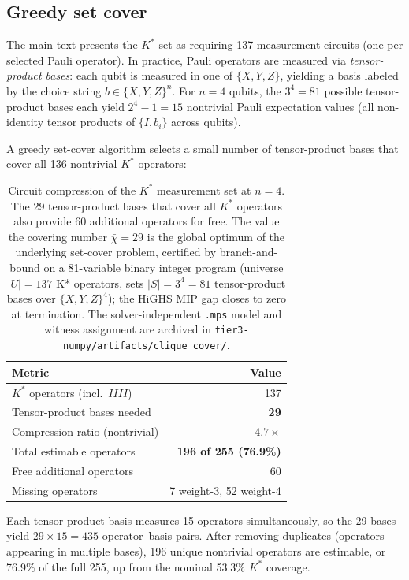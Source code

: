 \documentclass[twocolumn,prx,aps,superscriptaddress,longbibliography,floatfix]{revtex4-2}
\begin{document}
\subsection{Greedy set cover}

The main text presents the $K^*$ set as requiring 137 measurement
circuits (one per selected Pauli operator).  In practice, Pauli
operators are measured via \emph{tensor-product bases}: each qubit
is measured in one of $\{X, Y, Z\}$, yielding a basis labeled by
the choice string $b \in \{X,Y,Z\}^n$.  For $n = 4$ qubits, the
$3^4 = 81$ possible tensor-product bases each yield $2^4 - 1 = 15$
nontrivial Pauli expectation values (all non-identity tensor
products of $\{I, b_i\}$ across qubits).

A greedy set-cover algorithm selects a small number of
tensor-product bases that cover all 136 nontrivial $K^*$
operators:

\begin{table}[ht!]
\caption{Circuit compression of the $K^*$ measurement set at
$n = 4$.  The 29 tensor-product bases that cover all $K^*$
operators also provide 60 additional operators for free.  The
value the covering number $\bar\chi = 29$ is the global optimum of the underlying
set-cover problem, certified by branch-and-bound on a 81-variable
binary integer program (universe $|U|=137$ K* operators, sets
$|S|=3^4=81$ tensor-product bases over $\{X,Y,Z\}^4$); the HiGHS
MIP gap closes to zero at termination.  The solver-independent
\texttt{.mps} model and witness assignment are archived in
\texttt{tier3-numpy/artifacts/clique\_cover/}.}
\label{tab:circuits}
\begin{ruledtabular}
\begin{tabular}{lr}
Metric & Value \\
\hline
$K^*$ operators (incl.\ $IIII$) & 137 \\
Tensor-product bases needed & \textbf{29} \\
Compression ratio (nontrivial) & $4.7\times$ \\
Total estimable operators & \textbf{196 of 255 (76.9\%)} \\
Free additional operators & 60 \\
Missing operators & 7 weight-3, 52 weight-4 \\
\end{tabular}
\end{ruledtabular}
\end{table}

Each tensor-product basis measures 15 operators simultaneously, so
the 29 bases yield $29 \times 15 = 435$ operator--basis pairs.
After removing duplicates (operators appearing in multiple bases),
196 unique nontrivial operators are estimable, or 76.9\% of the full
255, up from the nominal 53.3\% $K^*$ coverage.
\end{document}
